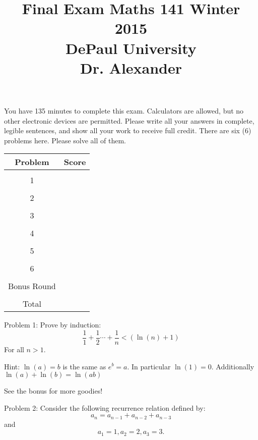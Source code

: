 \documentclass[16 pt]{amsart}
\theoremstyle{definition}
\theoremstyle{remark}
\numberwithin{equation}{subsection}
\begin{document}
\title{Final Exam Maths 141 Winter 2015 \\ DePaul University\\Dr. Alexander}
\maketitle
You have 135 minutes to complete this exam.  Calculators are allowed, but no other electronic devices are permitted.  Please write all your answers in complete, legible sentences, and show all your work to receive full credit.  There are six (6) problems here.  Please solve all of them.  
\vspace{1in}


\begin{center}
  \begin{tabular}{ c | c }
    Problem & Score\\
    \hline
    &\\
    1&\\
    &\\
    2&\\
    &\\
    3&\\
    &\\
    4&\\
    &\\
    5&\\
    &\\
    6&\\
    &\\
    Bonus Round 
    &\\
    \hline 
    &\\    
    Total& 
 \end{tabular}
\end{center}


\newpage


Problem 1: Prove by induction:
\[
\frac{1}{1} + \frac{1}{2} \cdots + \frac{1}{n} < (\ln(n) + 1)
\]
For all $n>1$.

\vspace{.5in}

Hint: $\ln(a) = b$ is the same as $e^b =a$. In particular $\ln(1)=0$. Additionally $\ln(a) + \ln(b) = \ln(ab)$

See the bonus for more goodies!
 
\newpage


Problem 2: Consider the following recurrence relation defined by:
\[
a_n = a_{n-1}+a_{n-2}+a_{n-3}
\]
and
\[
a_1 = 1, a_2 = 2, a_3 =3.
\]
\end{document}
